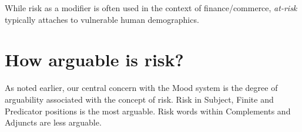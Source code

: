     \vspace{5mm}\noindent\begin{tcolorbox}[colback=yellow!5,colframe=yellow!40!black,title=Summary: participants modified by risk]
    \parbox{1\textwidth}{%
    While risk as a modifier is often used in the context of finance\slash commerce, \emph{at-risk} typically attaches to vulnerable human demographics.}
    \end{tcolorbox}
    \vspace{5mm}

\section{How arguable is risk?} \label{sect:arguability} \FloatBarrier

    As noted earlier, our central concern with the Mood system is the degree of arguability associated with the concept of risk. Risk in Subject, Finite and Predicator positions is the most arguable. Risk words within Complements and Adjuncts are less arguable.


